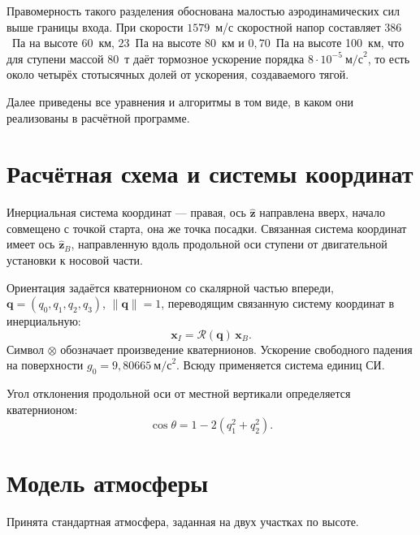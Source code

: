 \documentclass[11pt,a4paper]{article}
\newcommand{\vect}[1]{\bm{#1}}
\newcommand{\quat}[1]{\bm{#1}}
\newcommand{\Rot}{\mathcal{R}}
\begin{document}
Правомерность такого разделения обоснована малостью аэродинамических сил выше
границы входа. При скорости $1579$~м/с скоростной напор составляет $386$~Па на
высоте 60~км, $23$~Па на высоте 80~км и $0{,}70$~Па на высоте 100~км, что для
ступени массой 80~т даёт тормозное ускорение порядка
$8\cdot10^{-5}\ \text{м/с}^2$, то есть около четырёх стотысячных долей от
ускорения, создаваемого тягой.

Далее приведены все уравнения и алгоритмы в том виде, в каком они реализованы в
расчётной программе.

\section{Расчётная схема и системы координат}

Инерциальная система координат — правая, ось $\hat{\vect{z}}$ направлена вверх,
начало совмещено с точкой старта, она же точка посадки. Связанная система
координат имеет ось $\hat{\vect{z}}_B$, направленную вдоль продольной оси
ступени от двигательной установки к носовой части.

Ориентация задаётся кватернионом со скалярной частью впереди,
$\quat{q}=(q_0,q_1,q_2,q_3)$, $\lVert\quat{q}\rVert=1$, переводящим связанную
систему координат в инерциальную:
\begin{equation}
\vect{x}_I=\Rot(\quat{q})\,\vect{x}_B .
\end{equation}
Символ $\otimes$ обозначает произведение кватернионов. Ускорение свободного
падения на поверхности $g_0=9{,}80665\ \text{м/с}^2$. Всюду применяется система
единиц СИ.

Угол отклонения продольной оси от местной вертикали определяется кватернионом:
\begin{equation}
\cos\theta = 1-2\left(q_1^2+q_2^2\right).
\label{eq:tilt}
\end{equation}

\section{Модель атмосферы}

Принята стандартная атмосфера, заданная на двух участках по высоте.
\end{document}
